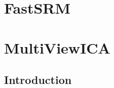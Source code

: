 \documentclass{report}
\begin{document}

\chapter{FastSRM}

\chapter{MultiViewICA}
\section{Introduction}
\end{document}
